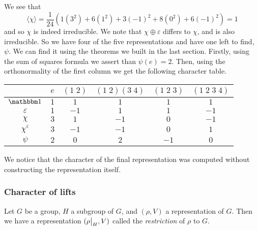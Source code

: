 \begin{example}
\begin{center}
\begin{tabular}{cccccc}
            \bottomrule
        \end{tabular}
    \end{center}
    We see that
    \[ \langle \chi \rangle = \frac1{24}\left(1(3^2) + 6(1^2) + 3(-1)^2 + 8(0^2) + 6(-1)^2\right) = 1 \]
    and so $\chi$ is indeed irreducible. We note that $\chi \oplus \varepsilon$ differs to $\chi$, and is also irreducible. So we have four of the five representations and have one left to find, $\psi$. We can find it using the theorems we built in the last section. Firstly, using the sum of squares formula we assert than $\psi(e) = 2$. Then, using the orthonormality of the first column we get the following character table.
    \begin{center}
        \begin{tabular}{cccccc}
            \toprule
                               & $e$ & $(1\;2)$ & $(1\;2)(3\;4)$ & $(1\;2\;3)$ & $(1\;2\;3\;4)$ \\
            \midrule
            $\mathbbm 1$       & $1$ & $1$      & $1$            & $1$         & $1$            \\
            $\varepsilon$      & $1$ & $-1$     & $1$            & $1$         & $-1$           \\
            $\chi$             & $3$ & $1$      & $-1$           & $0$         & $-1$           \\
            $\chi^\varepsilon$ & $3$ & $-1$     & $-1$           & $0$         & $1$            \\
            $\psi$             & $2$ & $0$      & $2$           & $-1$        & $0$            \\
            \bottomrule
        \end{tabular}
    \end{center}
    We notice that the character of the final representation was computed without constructing the representation itself.
\end{example}

\subsubsection{Character of lifts}

\begin{definition}[Restriction]
    Let $G$ be a group, $H$ a subgroup of $G$, and $(\rho, V)$ a representation of $G$. Then we have a representation $(\restr{\rho}H, V)$ called the \emph{restriction} of $\rho$ to $G$.
\end{definition}


